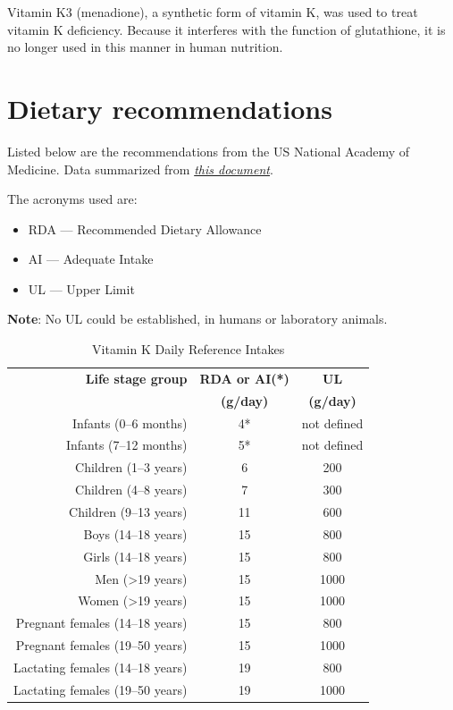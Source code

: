 \documentclass{book}
\begin{document}
\begin{sloppypar}
Vitamin K3 (menadione), a synthetic form of vitamin K, was used to treat vitamin K deficiency.
Because it interferes with the function of glutathione, it is no longer used in this manner in human nutrition.

\section{Dietary recommendations}
Listed below are the recommendations from the US National Academy of Medicine. Data summarized from \href{https://nap.nationalacademies.org/read/10026/chapter/7}{\textit{this document}}.

The acronyms used are:
\begin{itemize}
	\item RDA --- Recommended Dietary Allowance
	\item AI --- Adequate Intake
	\item UL --- Upper Limit
\end{itemize}

\textbf{Note}: No UL could be established, in humans or laboratory animals.

\begin{table}[ht]
	\caption{Vitamin K Daily Reference Intakes}
	\centering \begin{tabular}{| r | c | c |}
		\hline
		\textbf{Life stage group}			& \textbf{RDA or AI(*)}		& \textbf{UL}				\\
											& \textbf{(\textmu g/day)}	& \textbf{(\textmu g/day)}	\\ \hline
		Infants (0--6 months)				& 4*						& not defined				\\ \hline
		Infants (7--12 months)				& 5*						& not defined				\\ \hline
		Children (1--3 years)				& 6							& 200						\\ \hline
		Children (4--8 years)				& 7							& 300						\\ \hline
		Children (9--13 years)				& 11						& 600						\\ \hline
		Boys (14--18 years)					& 15						& 800						\\ \hline
		Girls (14--18 years)				& 15						& 800						\\ \hline
		Men (\textgreater19 years)			& 15						& 1000						\\ \hline
		Women (\textgreater19 years)		& 15						& 1000						\\ \hline
		Pregnant females (14--18 years)		& 15						& 800						\\ \hline
		Pregnant females (19--50 years)		& 15						& 1000						\\ \hline
		Lactating females (14--18 years)	& 19						& 800						\\ \hline
		Lactating females (19--50 years)	& 19						& 1000						\\ \hline
	\end{tabular}
\end{table}
\newpage


\end{sloppypar}
\end{document}
